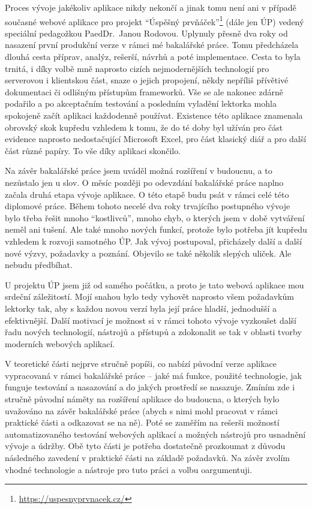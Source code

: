 Proces vývoje jakékoliv aplikace nikdy nekončí a jinak tomu není ani v případě současné webové aplikace pro projekt \enquote{Úspěšný prvňáček}\footnote{\url{https://uspesnyprvnacek.cz/}} (dále jen ÚP) vedený speciální pedagožkou PaedDr.~Janou Rodovou. Uplynuly přesně dva roky od nasazení první produkční verze v rámci mé bakalářské práce. Tomu předcházela dlouhá cesta příprav, analýz, rešerší, návrhů a poté implementace. Cesta to byla trnitá, i díky volbě mně naprosto cizích nejmodernějších technologií pro serverovou i klientskou část, snaze o jejich propojení, někdy nepříliš přívětivé dokumentaci či odlišným přístupům frameworků. Vše se ale nakonec zdárně podařilo a po akceptačním testování a posledním vyladění lektorka mohla spokojeně začít aplikaci každodenně používat. Existence této aplikace znamenala obrovský skok kupředu vzhledem k tomu, že do té doby byl užíván pro část evidence naprosto nedostačující Microsoft Excel, pro část klasický diář a pro další část různé papíry. To vše díky aplikaci skončilo.

Na závěr bakalářské práce jsem uváděl možná rozšíření v budoucnu, a to nezůstalo jen u slov. O měsíc později po odevzdání bakalářské práce naplno začala druhá etapa vývoje aplikace. O této etapě budu psát v rámci celé této diplomové práce. Během tohoto necelé dva roky trvajícího postupného vývoje bylo třeba řešit mnoho \enquote{kostlivců}, mnoho chyb, o kterých jsem v době vytváření neměl ani tušení. Ale také mnoho nových funkcí, protože bylo potřeba jít kupředu vzhledem k rozvoji samotného ÚP. Jak vývoj postupoval, přicházely další a další nové výzvy, požadavky a poznání. Objevilo se také několik slepých uliček. Ale nebudu předbíhat.

U projektu ÚP jsem již od samého počátku, a proto je tato webová aplikace mou srdeční záležitostí. Mojí snahou bylo tedy vyhovět naprosto všem požadavkům lektorky tak, aby s každou novou verzí byla její práce hladší, jednodušší a efektivnější. Další motivací je možnost si v rámci tohoto vývoje vyzkoušet další řadu nových technologií, nástrojů a přístupů a zdokonalit se tak v oblasti tvorby moderních webových aplikací.

V teoretické části nejprve stručně popíši, co nabízí původní verze aplikace vypracovaná v rámci bakalářské práce -- jaké má funkce, použité technologie, jak funguje testování a nasazování a do jakých prostředí se nasazuje. Zmíním zde i stručně původní náměty na rozšíření aplikace do budoucna, o kterých bylo uvažováno na závěr bakalářské práce (abych s nimi mohl pracovat v rámci praktické části a odkazovat se na ně). Poté se zaměřím na rešerši možností automatizovaného testování webových aplikací a možných nástrojů pro usnadnění vývoje a údržby. Obě tyto části je potřeba dostatečně prozkoumat z důvodu následného zavedení v praktické části na základě požadavků. Na závěr zvolím vhodné technologie a nástroje pro tuto práci a volbu oargumentuji.

